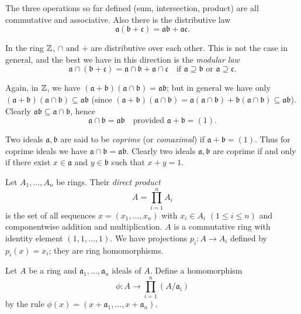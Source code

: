 The three operations so far defined (sum, intersection, product) are all commutative and associative. Also there is the distributive law
\[
    \mathfrak{a}(\mathfrak{b} + \mathfrak{c}) = \mathfrak{a}\mathfrak{b} + \mathfrak{a}\mathfrak{c}.
\]

In the ring $\mathbb{Z}$, $\cap$ and $+$ are distributive over each other. This is not the case in general, and the best we have in this direction is the \emph{modular law}
\[
    \mathfrak{a} \cap (\mathfrak{b} + \mathfrak{c}) = \mathfrak{a} \cap \mathfrak{b} + \mathfrak{a} \cap \mathfrak{c} \quad \text{if } \mathfrak{a} \supseteq \mathfrak{b} \text{ or } \mathfrak{a} \supseteq \mathfrak{c}.
\]

Again, in $\mathbb{Z}$, we have $(\mathfrak{a} + \mathfrak{b})(\mathfrak{a} \cap \mathfrak{b}) = \mathfrak{a}\mathfrak{b}$; but in general we have only $(\mathfrak{a} + \mathfrak{b})(\mathfrak{a} \cap \mathfrak{b}) \subseteq \mathfrak{a}\mathfrak{b}$ (since $(\mathfrak{a} + \mathfrak{b})(\mathfrak{a} \cap \mathfrak{b}) = \mathfrak{a}(\mathfrak{a} \cap \mathfrak{b}) + \mathfrak{b}(\mathfrak{a} \cap \mathfrak{b}) \subseteq \mathfrak{a}\mathfrak{b}$). Clearly $\mathfrak{a}\mathfrak{b} \subseteq \mathfrak{a} \cap \mathfrak{b}$, hence
\[
    \mathfrak{a} \cap \mathfrak{b} = \mathfrak{a}\mathfrak{b} \quad \text{provided } \mathfrak{a} + \mathfrak{b} = (1).
\]

Two ideals $\mathfrak{a}, \mathfrak{b}$ are said to be \emph{coprime} (or \emph{comaximal}) if $\mathfrak{a} + \mathfrak{b} = (1)$. Thus for coprime ideals we have $\mathfrak{a} \cap \mathfrak{b} = \mathfrak{a}\mathfrak{b}$. Clearly two ideals $\mathfrak{a}, \mathfrak{b}$ are coprime if and only if there exist $x \in \mathfrak{a}$ and $y \in \mathfrak{b}$ such that $x + y = 1$.

Let $A_1, \ldots, A_n$ be rings. Their \emph{direct product}
\[
A = \prod_{i=1}^{n} A_i
\]
is the set of all sequences $x = (x_1, \ldots, x_n)$ with $x_i \in A_i$ $(1 \le i \le n)$ and componentwise addition and multiplication. $A$ is a commutative ring with identity element $(1, 1, \ldots, 1)$. We have projections $p_i \colon A \to A_i$ defined by $p_i(x) = x_i$; they are ring homomorphisms.

Let $A$ be a ring and $\mathfrak{a}_1, \ldots, \mathfrak{a}_n$ ideals of $A$. Define a homomorphism
\[
\phi \colon A \to \prod_{i=1}^{n} (A/\mathfrak{a}_i)
\]
by the rule $\phi(x) = (x + \mathfrak{a}_1, \ldots, x + \mathfrak{a}_n)$.

